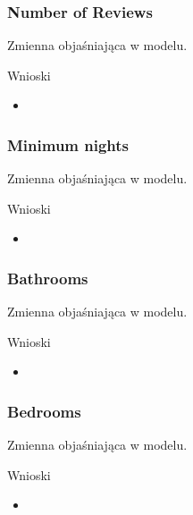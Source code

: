 \subsubsection{Number of Reviews}\label{subsubsec:number-of-reviews}
Zmienna objaśniająca w modelu.



Wnioski

\begin{itemize}
    \item
\end{itemize}


\subsubsection{Minimum nights}\label{subsubsec:minimum-nights}
Zmienna objaśniająca w modelu.



Wnioski

\begin{itemize}
    \item
\end{itemize}

\subsubsection{Bathrooms}\label{subsubsec:bathrooms}
Zmienna objaśniająca w modelu.



Wnioski

\begin{itemize}
    \item
\end{itemize}

\subsubsection{Bedrooms}\label{subsubsec:bedrooms}
Zmienna objaśniająca w modelu.



Wnioski

\begin{itemize}
    \item
\end{itemize}

